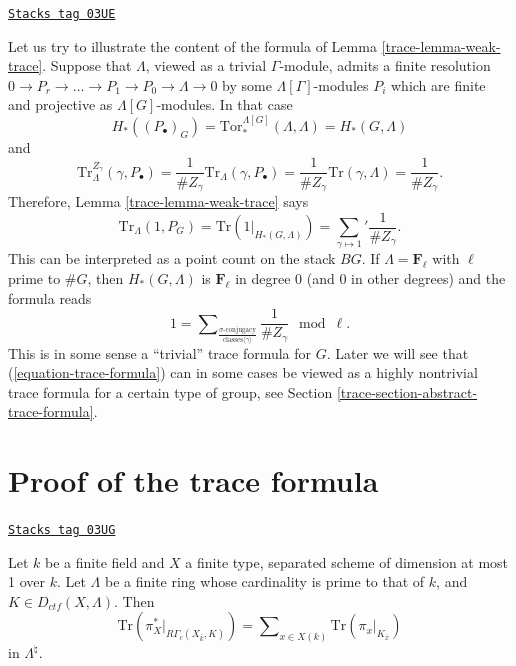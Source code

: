 \begin{remark}
\label{trace-remark-content-trivial-trace}
\href{https://stacks.math.columbia.edu/tag/03UE}{\texttt{Stacks tag 03UE}}

Let us try to illustrate the content of the formula of
Lemma \ref{trace-lemma-weak-trace}.
Suppose that $\Lambda$, viewed as a trivial $\Gamma$-module, admits a finite
resolution
$
0\to P_r\to \ldots \to P_1 \to P_0\to \Lambda\to 0
$
by some $\Lambda[\Gamma]$-modules $P_i$ which are finite and projective as
$\Lambda[G]$-modules. In that case
$$
H_*\left(\left(P_\bullet\right)_G\right) =
\text{Tor}_*^{\Lambda[G]}\left(\Lambda, \Lambda\right) = H_*(G, \Lambda)
$$
and
$$
\text{Tr}_\Lambda^{Z_\gamma}\left(\gamma, P_\bullet\right) =\frac{1}{\#
Z_\gamma}\text{Tr}_\Lambda(\gamma, P_\bullet)=\frac{1}{\#
Z_\gamma}\text{Tr}(\gamma, \Lambda) = \frac{1}{\# Z_\gamma}.
$$
Therefore, Lemma \ref{trace-lemma-weak-trace} says
$$
\text{Tr}_\Lambda (1 , P_G)
= \text{Tr}\left(1 |_{H_*(G, \Lambda)}\right)
= {\sum_{\gamma\mapsto 1}}'\frac{1}{\# Z_\gamma}.
$$
This can be interpreted as a point count on the stack $BG$. If
$\Lambda = \mathbf{F}_\ell$ with $\ell$ prime to $\# G$, then
$H_*(G, \Lambda)$ is $\mathbf{F}_\ell$ in degree 0 (and $0$ in
other degrees) and the formula reads
$$
1 =
\sum\nolimits_{
\frac{\sigma\text{-conjugacy}}{\text{classes}\langle\gamma\rangle}
}
\frac{1}{\# Z_\gamma} \mod \ell.
$$
This is in some sense a ``trivial'' trace formula for $G$.
Later we will see that (\ref{equation-trace-formula}) can in
some cases be viewed as a highly nontrivial trace formula for a
certain type of group, see
Section \ref{trace-section-abstract-trace-formula}.
\end{remark}



\section{Proof of the trace formula}
\label{trace-section-proof-trace-formula}
\begin{theorem}
\label{trace-theorem-trace-formula-again}
\href{https://stacks.math.columbia.edu/tag/03UG}{\texttt{Stacks tag 03UG}}

Let $k$ be a finite field and $X$ a finite type, separated scheme of dimension
at most 1 over $k$. Let $\Lambda$ be a finite ring whose cardinality is prime
to that of $k$, and $K\in D_{ctf}(X, \Lambda)$. Then
\begin{equation}
\label{equation-trace-formula-again}
\text{Tr}(\pi_X^* |_{R\Gamma_c(X_{\bar k}, K)})
=
\sum\nolimits_{x\in X(k)}
\text{Tr}(\pi_x |_{K_{\bar x}})
\end{equation}
in $\Lambda^{\natural}$.
\end{theorem}

